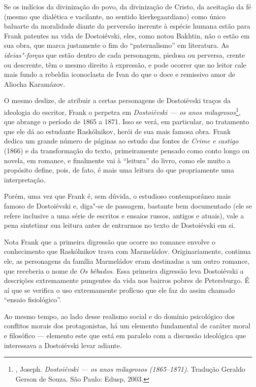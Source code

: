 {{Se os indícios da divinização do povo, da divinização de Cristo, da
aceitação da fé (mesmo que dialética e vacilante, no sentido
kierkegaardiano) como único baluarte da moralidade diante da perversão
inerente à espécie humana estão para Frank patentes na vida de
Dostoiévski, eles, como notou Bakhtin, não o estão em sua obra, que
marca justamente o fim do ``paternalismo'' em literatura. As
\emph{ideias"-forças} que estão dentro de cada personagem, piedosa
ou perversa, crente ou descrente, têm o mesmo direito à expressão, e
pode ocorrer que no leitor cale mais fundo a rebeldia iconoclasta de
Ivan do que o doce e remissivo amor de Aliocha Karamázov.

O mesmo deslize, de atribuir a certas personagens de Dostoiévski traços
da ideologia do escritor, Frank o perpetra em \emph{Dostoiévski --- os
anos milagrosos}\footnote{, Joseph. \emph{Dostoiévski --- os anos
  milagrosos (1865--1871)}. Tradução Geraldo Gerson de Souza. São Paulo:
  Edusp, 2003.}, que abrange o período de 1865 a 1871. Isso se verá, em
particular, no tratamento que ele dá ao estudante Raskólnikov, herói de
sua mais famosa obra. Frank dedica um grande número de páginas ao estudo
das fontes de \emph{Crime e castigo} (1866) e da transformação do texto,
primeiramente pensado como conto longo ou novela, em romance, e
finalmente vai à ``leitura'' do livro, como ele muito a propósito
define, pois, de fato, é mais uma leitura do que propriamente uma
interpretação.

Porém, uma vez que Frank é, sem dúvida, o estudioso contemporâneo mais
famoso de Dostoiévski e, diga"-se de passagem, bastante bem documentado
(ele se refere inclusive a uma série de escritos e ensaios russos,
antigos e atuais), vale a pena sintetizar sua leitura antes de entrarmos
no texto de Dostoiévski em si.

Nota Frank que a primeira digressão que ocorre no romance envolve o
conhecimento que Raskólnikov trava com Marmeládov. Originariamente,
continua ele, as personagens da família Marmeládov eram destinadas a um
outro romance, que receberia o nome de \emph{Os bêbados}. Essa primeira
digressão leva Dostoiévski a descrições extremamente pungentes da vida
nos bairros pobres de Petersburgo. É aí que se verifica o uso
extremamente profícuo que ele faz do assim chamado ``ensaio
fisiológico''.

Ao mesmo tempo, ao lado desse realismo social e do domínio psicológico
dos conflitos morais dos protagonistas, há um elemento fundamental de
caráter moral e filosófico --- elemento este que está em paralelo com a
discussão ideológica que interessava a Dostoiévski levar adiante.

}}
